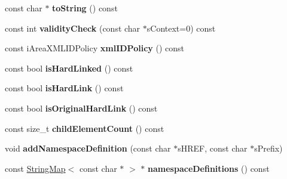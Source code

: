 \begin{DoxyCompactItemize}
\item 
\hypertarget{classgeneral__server_1_1LibXmlBaseNode_aa3a359201cf7520b1e153bfae4d6159e}{const char $\ast$ {\bfseries to\-String} () const }\label{classgeneral__server_1_1LibXmlBaseNode_aa3a359201cf7520b1e153bfae4d6159e}

\item 
\hypertarget{classgeneral__server_1_1LibXmlBaseNode_af763f3f0ec737c8b1f6306a540f48c56}{const int {\bfseries validity\-Check} (const char $\ast$s\-Context=0) const }\label{classgeneral__server_1_1LibXmlBaseNode_af763f3f0ec737c8b1f6306a540f48c56}

\item 
\hypertarget{classgeneral__server_1_1LibXmlBaseNode_a5fc9c62bf96457b1d8722a6df357a8ea}{const i\-Area\-X\-M\-L\-I\-D\-Policy {\bfseries xml\-I\-D\-Policy} () const }\label{classgeneral__server_1_1LibXmlBaseNode_a5fc9c62bf96457b1d8722a6df357a8ea}

\item 
\hypertarget{classgeneral__server_1_1LibXmlBaseNode_af3724396f8a8c3bf3fd752a859cd5164}{const bool {\bfseries is\-Hard\-Linked} () const }\label{classgeneral__server_1_1LibXmlBaseNode_af3724396f8a8c3bf3fd752a859cd5164}

\item 
\hypertarget{classgeneral__server_1_1LibXmlBaseNode_addc179a886ac8fa8175bb5fb5a88938e}{const bool {\bfseries is\-Hard\-Link} () const }\label{classgeneral__server_1_1LibXmlBaseNode_addc179a886ac8fa8175bb5fb5a88938e}

\item 
\hypertarget{classgeneral__server_1_1LibXmlBaseNode_aaed20a95c01d8e3039d8615b4f737046}{const bool {\bfseries is\-Original\-Hard\-Link} () const }\label{classgeneral__server_1_1LibXmlBaseNode_aaed20a95c01d8e3039d8615b4f737046}

\item 
\hypertarget{classgeneral__server_1_1LibXmlBaseNode_a76697d24aeb261e5db2df27267b0886f}{const size\-\_\-t {\bfseries child\-Element\-Count} () const }\label{classgeneral__server_1_1LibXmlBaseNode_a76697d24aeb261e5db2df27267b0886f}

\item 
\hypertarget{classgeneral__server_1_1LibXmlBaseNode_a7545523dba51dd4f492bee57566504da}{void {\bfseries add\-Namespace\-Definition} (const char $\ast$s\-H\-R\-E\-F, const char $\ast$s\-Prefix)}\label{classgeneral__server_1_1LibXmlBaseNode_a7545523dba51dd4f492bee57566504da}

\item 
\hypertarget{classgeneral__server_1_1LibXmlBaseNode_adc75e1ffa906ac90d75824b9f174a1c1}{const \hyperlink{classgeneral__server_1_1StringMap}{\-String\-Map}$<$ const char $\ast$ $>$ $\ast$ {\bfseries namespace\-Definitions} () const }\label{classgeneral__server_1_1LibXmlBaseNode_adc75e1ffa906ac90d75824b9f174a1c1}


\end{DoxyCompactItemize}
